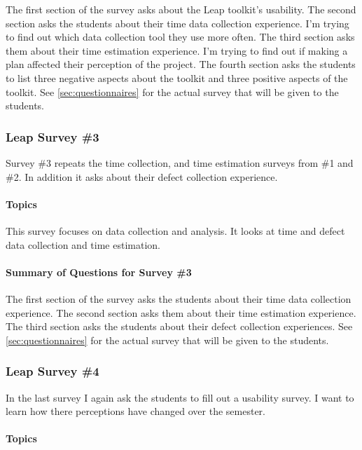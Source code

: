 The first section of the survey asks about the Leap toolkit's usability. The
second section asks the students about their time data collection experience.
I'm trying to find out which data collection tool they use more often.  The
third section asks them about their time estimation experience.  I'm trying to
find out if making a plan affected their perception of the project. The fourth
section asks the students to list three negative aspects about the toolkit and
three positive aspects of the toolkit.  See \ref{sec:questionnaires} for the
actual survey that will be given to the students.


\subsubsection{Leap Survey \#3}
\label{area3}
Survey \#3 repeats the time collection, and time estimation surveys from \#1
and \#2.  In addition it asks about their defect collection experience.

\paragraph{Topics}

This survey focuses on data collection and analysis.  It looks at time and
defect data collection and time estimation.

\paragraph{Summary of Questions for Survey \#3}
The first section of the survey asks the students about their time data
collection experience.  The second section asks them about their time
estimation experience.  The third section asks the students about their defect
collection experiences.  See \ref{sec:questionnaires} for the actual survey
that will be given to the students.

\subsubsection{Leap Survey \#4}
\label{area4}
In the last survey I again ask the students to fill out a usability survey.  I
want to learn how there perceptions have changed over the semester.

\paragraph{Topics}

